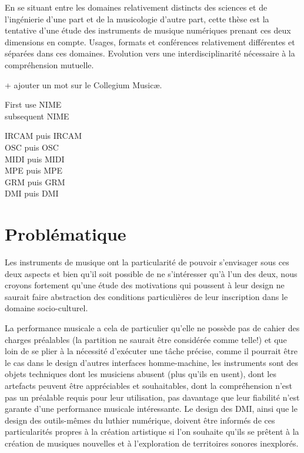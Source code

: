 En se situant entre les domaines relativement distincts des sciences et de l'ingénierie d'une part et de la musicologie d'autre part, cette thèse est la tentative d'une étude des instruments de musique numériques prenant ces deux dimensions en compte.
Usages, formats et conférences relativement différentes et séparées dans ces domaines. 
Evolution vers une interdisciplinarité nécessaire à la compréhension mutuelle.

+ ajouter un mot sur le Collegium Musicæ.

First use \gls{NIME}\\
subsequent \gls{NIME}

\gls{IRCAM} puis \gls{IRCAM}\\
\gls{OSC} puis \gls{OSC}\\
\gls{MIDI} puis \gls{MIDI}\\
\gls{MPE} puis \gls{MPE}\\
\gls{GRM} puis \gls{GRM}\\
\gls{DMI} puis \gls{DMI}\\


\section{Problématique}

Les instruments de musique ont la particularité de pouvoir s'envisager sous ces deux aspects et bien qu'il soit possible de ne s'intéresser qu'à l'un des deux, nous croyons fortement qu'une étude des motivations qui poussent à leur design ne saurait faire abstraction des conditions particulières de leur inscription dans le domaine socio-culturel.

La performance musicale a cela de particulier qu'elle ne possède pas de cahier des charges préalables (la partition ne saurait être considérée comme telle!) et que loin de se plier à la nécessité d'exécuter une tâche précise, comme il pourrait être le cas dans le design d'autres interfaces homme-machine, les instruments sont des objets techniques dont les musiciens abusent (plus qu'ils en usent), dont les artefacts peuvent être appréciables et souhaitables, dont la compréhension n'est pas un préalable requis pour leur utilisation, pas davantage que leur fiabilité n'est garante d'une performance musicale intéressante.
%
Le design des DMI, ainsi que le design des outils-mêmes du luthier numérique, doivent être informés de ces particularités propres à la création artistique si l'on souhaite qu'ils se prêtent à la création de musiques nouvelles et à l'exploration de territoires sonores inexplorés.

